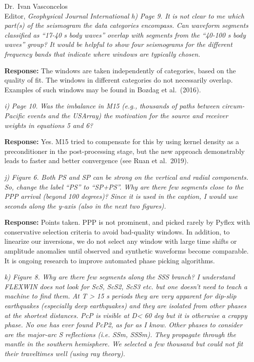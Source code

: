 \documentclass[11pt,a4paper]{letter}
\newcommand{\response}[1]{\textbf{Response:} #1}
\newcommand{\rev}[1]{{\it{#1}}}
\begin{document}
\begin{letter}{Dr.~Ivan Vasconcelos\\
Editor, \textit{Geophysical Journal International}}
\rev{h) Page 9. It is not clear to me which part(s) of the seismogram the data categories encompass. Can waveform segments classified as ``17-40 s body waves'' overlap with segments from the ``40-100 s body waves'' group? It would be helpful to show four seismograms for the different frequency bands that indicate where windows are typically chosen.
}

\response{The windows are taken independently of categories, based on the quality of fit. The windows in different categories do not necessarily overlap. Examples of such windows may be found in Bozdag et al.~(2016).}

\rev{i) Page 10. Was the imbalance in M15 (e.g., thousands of paths between circum-Pacific events and the USArray) the motivation for the source and receiver weights in equations 5 and 6?
}

\response{Yes. M15 tried to compensate for this by using kernel density as a preconditioner in the post-processing stage, but the new approach demonstrably leads to faster and better convergence (see Ruan et al.~2019).}

\rev{j) Figure 6. Both PS and SP can be strong on the vertical and radial components. So, change the label ``PS'' to ``SP+PS''. Why are there few segments close to the PPP arrival (beyond 100 degrees)? Since it is used in the caption, I would use seconds along the y-axis (also in the next two figures).
}

\response{Points taken. PPP is not prominent, and picked rarely by Pyflex with conservative selection criteria to avoid bad-quality windows. In addition, to linearize our inversions, we do not select any window with large time shifts or amplitude anomalies until observed and synthetic waveforms become comparable. It is ongoing research to improve automated phase picking algorithms.}

\rev{k) Figure 8. Why are there few segments along the SSS branch? I understand FLEXWIN does not look for ScS, ScS2, ScS3 etc. but one doesn't need to teach a machine to find them.
At T > 15 s periods they are very apparent for dip-slip earthquakes (especially deep earthquakes) and they are isolated from other phases at the shortest distances.
PcP is visible at D< 60 deg but it is otherwise a crappy phase. No one has ever found PcP2, as far as I know. Other phases to consider are the major-arc S reflections (i.e. SSm, SSSm). 
They propagate through the mantle in the southern hemisphere. We selected a few thousand but could not fit their traveltimes well (using ray theory).
}


\end{letter}
\end{document}
